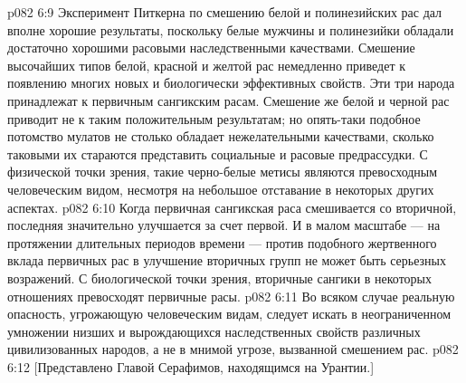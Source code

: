 \vs p082 6:9 Эксперимент Питкерна по смешению белой и полинезийских рас дал вполне хорошие результаты, поскольку белые мужчины и полинезийки обладали достаточно хорошими расовыми наследственными качествами. Смешение высочайших типов белой, красной и желтой рас немедленно приведет к появлению многих новых и биологически эффективных свойств. Эти три народа принадлежат к первичным сангикским расам. Смешение же белой и черной рас приводит не к таким положительным результатам; но опять\hyp{}таки подобное потомство мулатов не столько обладает нежелательными качествами, сколько таковыми их стараются представить социальные и расовые предрассудки. С физической точки зрения, такие черно\hyp{}белые метисы являются превосходным человеческим видом, несмотря на небольшое отставание в некоторых других аспектах.
\vs p082 6:10 \pc Когда первичная сангикская раса смешивается со вторичной, последняя значительно улучшается за счет первой. И в малом масштабе --- на протяжении длительных периодов времени --- против подобного жертвенного вклада первичных рас в улучшение вторичных групп не может быть серьезных возражений. С биологической точки зрения, вторичные сангики в некоторых отношениях превосходят первичные расы.
\vs p082 6:11 Во всяком случае реальную опасность, угрожающую человеческим видам, следует искать в неограниченном умножении низших и вырождающихся наследственных свойств различных цивилизованных народов, а не в мнимой угрозе, вызванной смешением рас.
\vsetoff
\vs p082 6:12 [Представлено Главой Серафимов, находящимся на Урантии.]
